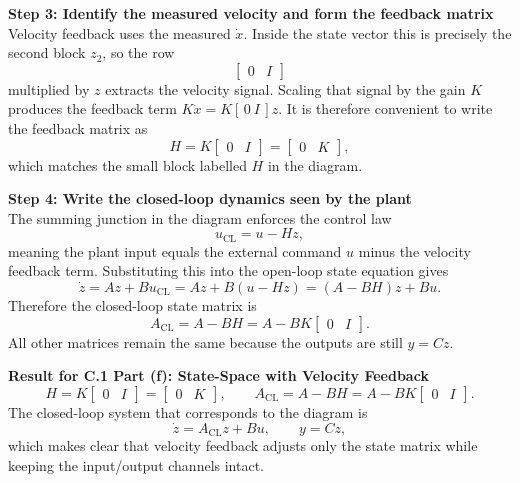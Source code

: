 \documentclass[12pt]{article}
\begin{document}
\begin{stepbox}
\textbf{Step 3: Identify the measured velocity and form the feedback matrix}\\[0.5em]
Velocity feedback uses the measured \(\dot{x}\).  Inside the state vector this is precisely the second block \(z_2\), so the row
\[
\begin{bmatrix} 0 & I \end{bmatrix}
\]
multiplied by \(z\) extracts the velocity signal.  Scaling that signal by the gain \(K\) produces the feedback term \(K\dot{x} = K[\,0 \ I\,]z\).
It is therefore convenient to write the feedback matrix as
\[
H = K\begin{bmatrix} 0 & I \end{bmatrix} = \begin{bmatrix} 0 & K \end{bmatrix},
\]
which matches the small block labelled \(H\) in the diagram.
\end{stepbox}

\begin{stepbox}
\textbf{Step 4: Write the closed-loop dynamics seen by the plant}\\[0.5em]
The summing junction in the diagram enforces the control law
\[
u_{\text{CL}} = u - H z,
\]
meaning the plant input equals the external command \(u\) minus the velocity feedback term.  Substituting this into the open-loop state equation gives
\[
\dot{z} = A z + B u_{\text{CL}} = A z + B(u - H z) = (A - B H) z + B u.
\]
Therefore the closed-loop state matrix is
\[
A_{\text{CL}} = A - B H = A - B K \begin{bmatrix} 0 & I \end{bmatrix}.
\]
All other matrices remain the same because the outputs are still \(y = C z\).
\end{stepbox}

\begin{resultsbox}
\textbf{Result for C.1 Part (f): State-Space with Velocity Feedback}\\[0.5em]
\[
H = K\begin{bmatrix} 0 & I \end{bmatrix} = \begin{bmatrix} 0 & K \end{bmatrix}, \qquad
A_{\text{CL}} = A - B H = A - B K \begin{bmatrix} 0 & I \end{bmatrix}.
\]
The closed-loop system that corresponds to the diagram is
\[
\dot{z} = A_{\text{CL}} z + B u, \qquad y = C z,
\]
which makes clear that velocity feedback adjusts only the state matrix while keeping the input/output channels intact.
\end{resultsbox}
\end{document}
